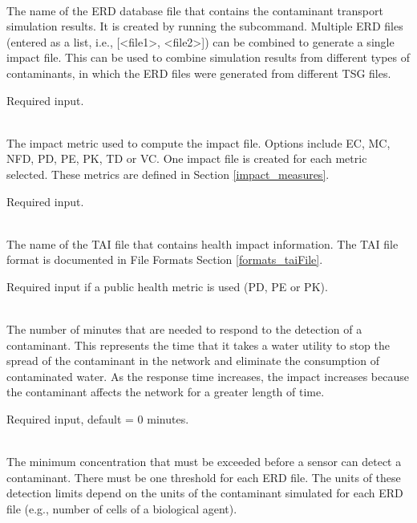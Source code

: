 \begin{description}[topsep=0pt,parsep=0.5em,itemsep=-0.4em]
  \item[{impact}]\hfill
  \begin{description}[topsep=0pt,parsep=0.5em,itemsep=-0.4em]
    \item[{erd file}]\hfill
\\The name of the ERD database file that contains the 
                contaminant transport simulation results. It is 
                created by running the  subcommand.
                Multiple ERD files (entered as a list, i.e., [<file1>, <file2>]) can be combined to
                generate a single impact file. This can be used to combine
                simulation results from different types of contaminants, in
                which the ERD files were generated from different
                TSG files.
                
                Required input.
    \item[{metric}]\hfill
\\The impact metric used to compute the impact file. Options
                include EC, MC, NFD, PD, PE, PK, TD or VC. One impact file 
                is created for each metric selected. These metrics are 
                defined in Section \ref{impact_measures}.
                
                Required input.
    \item[{tai file}]\hfill
\\The name of the TAI file that contains health impact information. 
                The TAI file format is documented in File Formats Section \ref{formats_taiFile}.
                
                Required input if a public health metric is used (PD, PE or PK).
    \item[{response time}]\hfill
\\The number of minutes that are needed to respond to the
                detection of a contaminant. This represents the time that it takes
                a water utility to stop the spread of the contaminant in the network and 
                eliminate the consumption of contaminated water. As the response time increases,
                the impact increases because the contaminant affects the network
                for a greater length of time.  
                
                Required input, default = 0 minutes.
    \item[{detection limit}]\hfill
\\The minimum concentration that must be exceeded before a sensor can detect a contaminant.
                There must be one threshold for each ERD file. The units of
                these detection limits depend on the units of the contaminant
                simulated for each ERD file (e.g., number of cells of a
                biological agent).  
                

\end{description}
\end{description}
